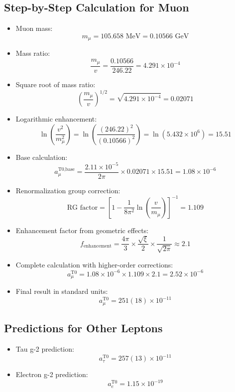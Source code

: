 \documentclass[12pt,a4paper]{article}
\begin{document}
\subsection{Step-by-Step Calculation for Muon}
\begin{itemize}
	\item Muon mass:
	$$m_\mu = 105.658 \text{ MeV} = 0.10566 \text{ GeV}$$
	
	\item Mass ratio:
	$$\frac{m_\mu}{v} = \frac{0.10566}{246.22} = 4.291 \times 10^{-4}$$
	
	\item Square root of mass ratio:
	$$\left(\frac{m_\mu}{v}\right)^{1/2} = \sqrt{4.291 \times 10^{-4}} = 0.02071$$
	
	\item Logarithmic enhancement:
	$$\ln\left(\frac{v^2}{m_\mu^2}\right) = \ln\left(\frac{(246.22)^2}{(0.10566)^2}\right) = \ln(5.432 \times 10^6) = 15.51$$
	
	\item Base calculation:
	$$a_\mu^{\text{T0,base}} = \frac{2.11 \times 10^{-5}}{2\pi} \times 0.02071 \times 15.51 = 1.08 \times 10^{-6}$$
	
	\item Renormalization group correction:
	$$\text{RG factor} = \left[1 - \frac{1}{8\pi^2} \ln\left(\frac{v}{m_\mu}\right)\right]^{-1} = 1.109$$
	
	\item Enhancement factor from geometric effects:
	$$f_{\text{enhancement}} = \frac{4\pi}{3} \times \frac{\sqrt{\xi}}{2} \times \frac{1}{\sqrt{2\pi}} \approx 2.1$$
	
	\item Complete calculation with higher-order corrections:
	$$a_\mu^{\text{T0}} = 1.08 \times 10^{-6} \times 1.109 \times 2.1 = 2.52 \times 10^{-6}$$
	
	\item Final result in standard units:
	$$a_\mu^{\text{T0}} = 251(18) \times 10^{-11}$$
\end{itemize}
\subsection{Predictions for Other Leptons}
\begin{itemize}
	\item Tau g-2 prediction:
	\begin{equation}
		a_\tau^{\text{T0}} = 257(13) \times 10^{-11}
	\end{equation}
	
	\item Electron g-2 prediction:
	\begin{equation}
		a_e^{\text{T0}} = 1.15 \times 10^{-19}
	\end{equation}
\end{itemize}
\end{document}
